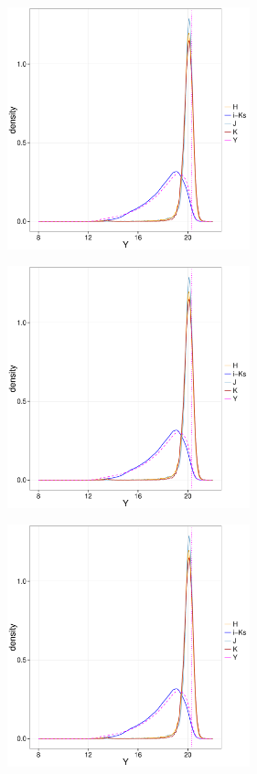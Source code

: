 \begin{figure}[ht!]
    \centering
    \begin{subfigure}[t]{0.45\textwidth}
        \includegraphics[page=1,height=7cm]{background/Figures/MissingDistributionsDDR2.pdf}
    \end{subfigure}
    \begin{subfigure}[t]{0.45\textwidth}
      \includegraphics[page=2,height=7cm]{background/Figures/MissingDistributionsDDR2.pdf}
    \end{subfigure}
     \begin{subfigure}[t]{0.45\textwidth}
      \includegraphics[page=3,height=7cm]{background/Figures/MissingDistributionsDDR2.pdf}

\end{subfigure}
\end{figure}
